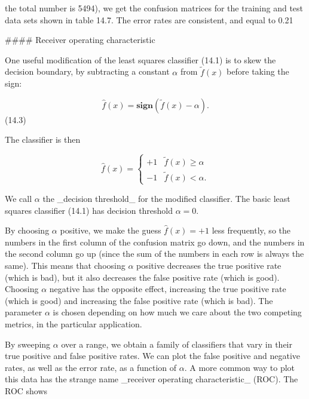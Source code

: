 the total number is 5494), we get the confusion matrices for the training and test data sets shown in table 14.7. The error rates are consistent, and equal to 0.21%

#### Receiver operating characteristic

One useful modification of the least squares classifier (14.1) is to skew the decision boundary, by subtracting a constant \(\alpha\) from \(\tilde{f}(x)\) before taking the sign:

\[\hat{f}(x)=\mathbf{sign}(\tilde{f}(x)-\alpha).\] (14.3)

The classifier is then

\[\hat{f}(x)=\left\{\begin{array}{cc}+1&\tilde{f}(x)\geq\alpha\\ -1&\tilde{f}(x)<\alpha.\end{array}\right.\]

We call \(\alpha\) the _decision threshold_ for the modified classifier. The basic least squares classifier (14.1) has decision threshold \(\alpha=0\).

By choosing \(\alpha\) positive, we make the guess \(\hat{f}(x)=+1\) less frequently, so the numbers in the first column of the confusion matrix go down, and the numbers in the second column go up (since the sum of the numbers in each row is always the same). This means that choosing \(\alpha\) positive decreases the true positive rate (which is bad), but it also decreases the false positive rate (which is good). Choosing \(\alpha\) negative has the opposite effect, increasing the true positive rate (which is good) and increasing the false positive rate (which is bad). The parameter \(\alpha\) is chosen depending on how much we care about the two competing metrics, in the particular application.

By sweeping \(\alpha\) over a range, we obtain a family of classifiers that vary in their true positive and false positive rates. We can plot the false positive and negative rates, as well as the error rate, as a function of \(\alpha\). A more common way to plot this data has the strange name _receiver operating characteristic_ (ROC). The ROC shows

